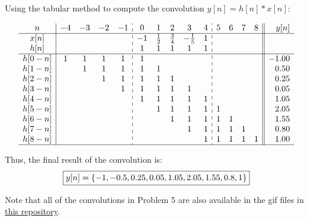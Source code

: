 \documentclass[a4paper, 10pt]{article}
\begin{document}
\begin{solution}
Using the tabular method to compute the convolution \( y[n] = h[n] * x[n] \):

\renewcommand{\arraystretch}{1.3}
\[
\begin{array}{c|cccc:ccccc:cccc||r}
n  & -4 & -3 & -2 & -1 & 0 & 1 & 2 & 3 & 4 & 5 & 6 & 7 & 8 & y[n] \\
\hline
x[n] &  &  &  &  & -1 & \frac{1}{2} & \frac{3}{4} & -\frac{1}{5} & 1 &  &  &  &  \\
h[n] &  &  &  &  & 1 & 1 & 1 & 1 & 1 &  &  &  &  \\
\hline
h[0-n] & 1 & 1 & 1 & 1 & 1 &  &  &  &  &  &  &  &  & -1.00 \\
h[1-n] &  & 1 & 1 & 1 & 1 & 1 &  &  &  &  &  &  &  & 0.50 \\
h[2-n] &  &  & 1 & 1 & 1 & 1 & 1 &  &  &  &  &  &  & 0.25 \\
h[3-n] &  &  &  & 1 & 1 & 1 & 1 & 1 &  &  &  &  &  & 0.05 \\
h[4-n] &  &  &  &  & 1 & 1 & 1 & 1 & 1 &  &  &  &  & 1.05 \\
h[5-n] &  &  &  &  &  & 1 & 1 & 1 & 1 & 1 &  &  &  & 2.05 \\
h[6-n] &  &  &  &  &  &  & 1 & 1 & 1 & 1 & 1 &  &  & 1.55 \\
h[7-n] &  &  &  &  &  &  &  & 1 & 1 & 1 & 1 & 1 &  & 0.80 \\
h[8-n] &  &  &  &  &  &  &  &  & 1 & 1 & 1 & 1 & 1 & 1.00 \\
\hline
\end{array}
\]

Thus, the final result of the convolution is:
\[ \boxed{ y[n] = \left\{ -1, -0.5, 0.25, 0.05, 1.05, 2.05, 1.55, 0.8, 1 \right\} } \]
\end{solution}

\vspace{3mm}

\begin{center}
Note that all of the convolutions in Problem 5 are also available in the gif files in \href{https://github.com/patthadon-p/CEDT-2110203-CEM-II/tree/main/signal/homework-2/images}{this repository}.
\end{center}

\newpage

\begin{problem}
\end{problem}
\end{document}
